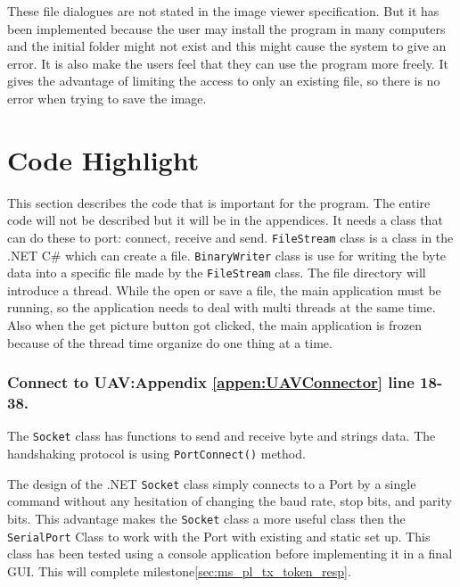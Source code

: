 These file dialogues are not stated in the image viewer specification. But it has been implemented because the user may install the program in many computers and the initial folder might not exist and this might cause the system to give an error. It is also make the users feel that they can use the program more freely.  It gives the advantage of limiting the access to only an existing file, so there is no error when trying to save the image.

 
\section{Code Highlight}

This section describes the code that is important for the program. The entire code will not be described but it will be in the appendices. It needs a class that can do these to port: connect, receive and send. \texttt{FileStream} class is a class in the .NET C\# which can create a file. \texttt{BinaryWriter} class is use for writing the byte data into a specific file made by the \texttt{FileStream} class. The file directory will introduce a thread. While the open or save a file, the main application must be running, so the application needs to deal with multi threads at the same time. Also when the get picture button got clicked, the main application is frozen because of the thread time organize do one thing at a time. 

\subsubsection*{Connect to UAV:Appendix \ref{appen:UAVConnector} line 18-38.}
The \texttt{Socket} class has functions to send and receive byte and strings data. The handshaking protocol is using \texttt{PortConnect()} method.  
        
The design of the .NET \texttt{Socket} class simply connects to a Port by a single command without any hesitation of changing the baud rate, stop bits, and parity bits. 
This advantage makes the \texttt{Socket} class a more useful class then the \texttt{SerialPort} Class to work with the Port with existing and static set up. 
This class has been tested using a console application before implementing it in a final GUI. 
This will complete milestone\ref{sec:ms_pl_tx_token_resp}.

